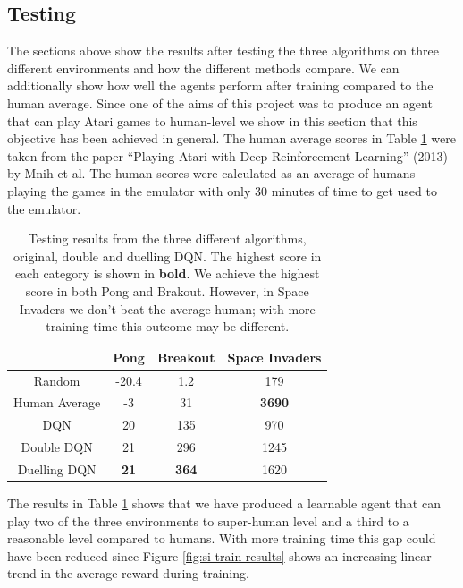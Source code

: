 \subsection{Testing}

The sections above show the results after testing the three algorithms on three different environments and how the different methods compare. We can additionally show how well the agents perform after training compared to the human average. Since one of the aims of this project was to produce an agent that can play Atari games to human-level we show in this section that this objective has been achieved in general. The human average scores in Table \ref{table:eval:testing-results} were taken from the paper ``Playing Atari with Deep Reinforcement Learning'' (2013) by Mnih et al. The human scores were calculated as an average of humans playing the games in the emulator with only 30 minutes of time to get used to the emulator.

\begin{table}[htbp]
  \centering
  \begin{tabular}{c|c|c|c|}
    \cline{2-4}
    \multicolumn{1}{l|}{}               & Pong        & Breakout     & Space Invaders \\ \hline
    \multicolumn{1}{|c|}{Random}        & -20.4       & 1.2          & 179            \\ \hline
    \multicolumn{1}{|c|}{Human Average} & -3          & 31           & \textbf{3690}  \\ \hline
    \multicolumn{1}{|c|}{DQN}           & 20          & 135          & 970            \\ \hline
    \multicolumn{1}{|c|}{Double DQN}    & 21          & 296          & 1245           \\ \hline
    \multicolumn{1}{|c|}{Duelling DQN}  & \textbf{21} & \textbf{364} & 1620           \\ \hline
  \end{tabular}
  \caption[Testing results for Original/Double/Duelling DQN]{Testing results from the three different algorithms, original, double and duelling DQN. The highest score in each category is shown in \textbf{bold}. We achieve the highest score in both Pong and Brakout. However, in Space Invaders we don't beat the average human; with more training time this outcome may be different.}\label{table:eval:testing-results}
\end{table}

The results in Table \ref{table:eval:testing-results} shows that we have produced a learnable agent that can play two of the three environments to super-human level and a third to a reasonable level compared to humans. With more training time this gap could have been reduced since Figure \ref{fig:si-train-results} shows an increasing linear trend in the average reward during training.


